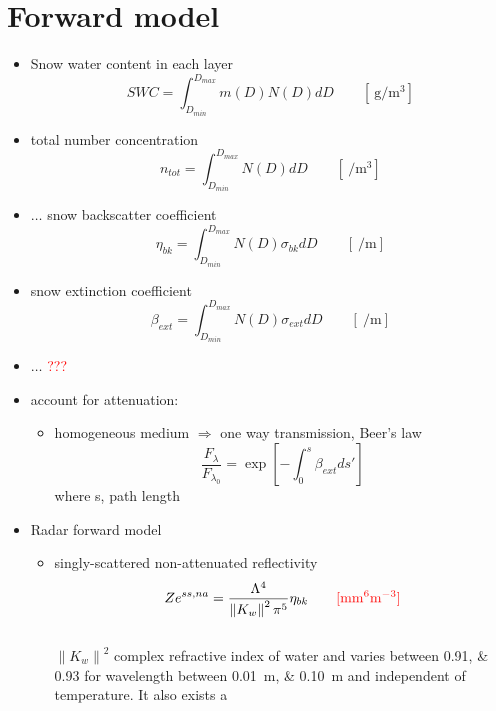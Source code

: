 \section{Forward model}
\begin{itemize}
	\item Snow water content  in each layer \\
	$$SWC = \int_{D_{min}}^{D_{max}} m(D) N(D) dD \qquad [\SI{}{\gram\per\cubic\metre}] $$
	\item total number concentration \\
	$$n_{tot} = \int_{D_{min}}^{D_{max}} N(D) dD \qquad [\SI{}{\per\cubic\metre}]$$ 
	\item $\ldots$ snow backscatter coefficient\\
	$$\eta_{bk} = \int_{D_{min}}^{D_{max}} N(D) \sigma_{bk} dD \qquad [\SI{}{\per\metre}]$$
	\item snow extinction coefficient \\
	$$\beta_{ext} = \int_{D_{min}}^{D_{max}} N(D) \sigma_{ext} dD \qquad [\SI{}{\per\metre}]$$
	\item $\ldots$ \textcolor{red}{???} \\
	\item account for attenuation:
	\begin{itemize}
		\item homogeneous medium $\Rightarrow$ one way transmission, Beer's law \\
		$$\frac{F_{\lambda}}{F_{\lambda_0}} = \exp \left[ - \int_0^s \beta_{ext} ds'\right] $$ where s, path length 
	\end{itemize}
	\item {Radar forward model}
	\begin{itemize}
		\item singly-scattered non-attenuated reflectivity
		$$Ze^{ss,na} = \frac{\Lambda^4}{\left\| K_w \right\|^2 \pi^5} \eta_{bk} \qquad \textcolor{red}{[\SI{}{\mm^6\metre^{-3}}]}$$ \\
		$\left\| K_w \right\|^2$ complex refractive index of water and varies between \numlist{0.91;0.93} for wavelength between \SIlist{0.01;0.10}{\metre} and independent of temperature. It also exists a  

\end{itemize}
\end{itemize}
